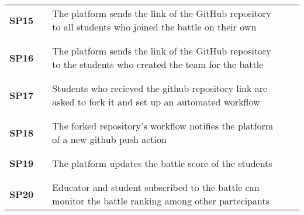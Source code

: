 \begin{longtable}[H]{l l p{8.5cm} l l}
    \textbf{SP15} & \vline & The platform sends the link of the GitHub repository to all students who joined the battle on their own & \vline &                        \\
                  &        &                                                                                                          &        &                        \\\hline & & & & \\
    \textbf{SP16} & \vline & The platform sends the link of the GitHub repository to the students who created the team for the battle & \vline &                        \\
                  &        &                                                                                                          &        &                        \\\hline & & & & \\
    \textbf{SP17} & \vline & Students who recieved the github repository link are asked to fork it and set up an automated workflow                        & \vline &                        \\
                  &        &                                                                                                          &        &                        \\\hline & & & & \\
    \textbf{SP18} & \vline & The forked repository's workflow notifies the platform of a new github push action                                     & \vline &                        \\
                  &        &                                                                                                          &        &                        \\\hline & & & & \\
    \textbf{SP19} & \vline & The platform updates the battle score of the students                                                          & \vline &                        \\
                  &        &                                                                                                          &        &                        \\\hline & & & & \\
    \textbf{SP20} & \vline & Educator and student subscribed to the battle can monitor the battle ranking among other partecipants                                                         & \vline &                        \\

\end{longtable}
